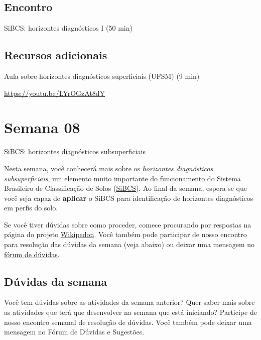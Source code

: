 \documentclass[
  11pt,
  a4paper,
  dvipsnames]{tufte-book}
\begin{document}
\hypertarget{encontro-3}{%
\section{Encontro}\label{encontro-3}}

SiBCS: horizontes diagnósticos I (50 min)

\hypertarget{recursos-adicionais-3}{%
\section{Recursos adicionais}\label{recursos-adicionais-3}}

Aula sobre horizontes diagnósticos superficiais (UFSM) (9 min)

\url{https://youtu.be/LYrOGzAt8dY}

\hypertarget{semana-08}{%
\chapter{Semana 08}\label{semana-08}}

SiBCS: horizontes diagnósticos subsuperficiais

Nesta semana, você conhecerá mais sobre os \emph{horizontes diagnósticos subsuperficiais}, um elemento muito importante do funcionamento do Sistema Brasileiro de Classificação de Solos (\href{https://www.embrapa.br/en/solos/sibcs}{SiBCS}). Ao final da semana, espera-se que você seja capaz de \textbf{aplicar} o SiBCS para identificação de horizontes diagnósticos em perfis do solo.

Se você tiver dúvidas sobre como proceder, comece procurando por respostas na página do projeto \href{https://pt.wikiversity.org/wiki/Wikipedon}{Wikipedon}. Você também pode participar de nosso encontro para resolução das dúvidas da semana (veja abaixo) ou deixar uma mensagem no \href{https://moodle.utfpr.edu.br/mod/forum/view.php?id=573329}{fórum de dúvidas}.

\hypertarget{duxfavidas-da-semana-6}{%
\section{Dúvidas da semana}\label{duxfavidas-da-semana-6}}

Você tem dúvidas sobre as atividades da semana anterior? Quer saber mais sobre as atividades que terá que desenvolver na semana que está iniciando? Participe de nosso encontro semanal de resolução de dúvidas. Você também pode deixar uma mensagem no Fórum de Dúvidas e Sugestões.
\end{document}
